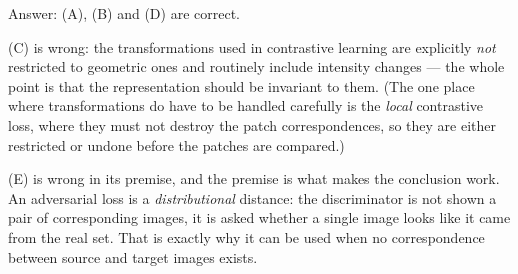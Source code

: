 \documentclass[11pt]{exam}
\begin{document}
\begin{questions}
\begin{solution}
  Answer: (A), (B) and (D) are correct.

  (C) is wrong: the transformations used in contrastive learning are explicitly \emph{not}
  restricted to geometric ones and routinely include intensity changes --- the whole point is that
  the representation should be invariant to them. (The one place where transformations do have to
  be handled carefully is the \emph{local} contrastive loss, where they must not destroy the patch
  correspondences, so they are either restricted or undone before the patches are compared.)

  (E) is wrong in its premise, and the premise is what makes the conclusion work. An adversarial
  loss is a \emph{distributional} distance: the discriminator is not shown a pair of corresponding
  images, it is asked whether a single image looks like it came from the real set. That is exactly
  why it can be used when no correspondence between source and target images exists.
\end{solution}

\end{questions}
\end{document}
